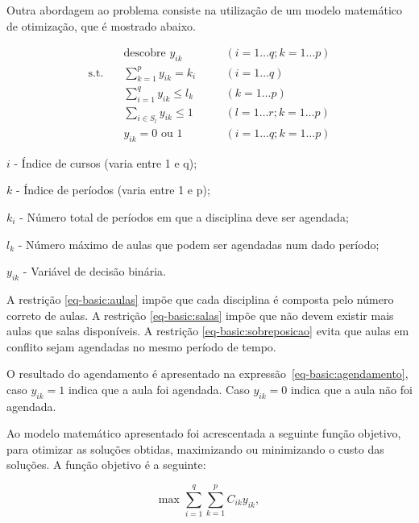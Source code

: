 Outra abordagem ao problema consiste na utilização de um modelo matemático de otimização, que é mostrado abaixo.

\begin{align}
    & \text{descobre } y_{ik} \quad &&(i = 1 \ldots q; k = 1 \ldots p) \nonumber \\
    \text{s.t.} \quad & \displaystyle\sum_{k=1}^{p} y_{ik} = k_i \quad &&(i = 1 \ldots q) \label{eq-basic:aulas}\\
    & \displaystyle\sum_{i=1}^{q} y_{ik} \leq l_k \quad &&(k = 1 \ldots p) \label{eq-basic:salas}\\
    & \displaystyle\sum_{i \in S_l} y_{ik} \leq 1 \quad &&(l = 1 \ldots r; k = 1 \ldots p) \label{eq-basic:sobreposicao}\\
    & y_{ik} = 0 \text{ ou } 1 \quad &&(i = 1 \ldots q; k = 1 \ldots p) \label{eq-basic:agendamento}
\end{align}

\begin{compactitem}
    \item $i$ - Índice de cursos (varia entre 1 e q);
    \item $k$ - Índice de períodos (varia entre 1 e p);
    \item $k_{i}$ - Número total de períodos em que a disciplina deve ser agendada;
    \item $l_{k}$ - Número máximo de aulas que podem ser agendadas num dado período;
    \item $y_{ik}$ - Variável de decisão binária.
\end{compactitem}

A restrição \eqref{eq-basic:aulas} impõe que cada disciplina é composta pelo número correto de aulas. A restrição \eqref{eq-basic:salas} impõe que não devem existir mais aulas que salas disponíveis. A restrição \eqref{eq-basic:sobreposicao} evita que aulas em conflito sejam agendadas no mesmo período de tempo.

O resultado do agendamento é apresentado na expressão~\eqref{eq-basic:agendamento}, caso $y_{ik} = 1$ indica que a aula foi agendada. Caso $y_{ik} = 0$ indica que a aula não foi agendada.

Ao modelo matemático apresentado foi acrescentada a seguinte função objetivo, para otimizar as soluções obtidas, maximizando ou minimizando o custo das soluções. A função objetivo é a seguinte:

\begin{equation}
    \text{max } \displaystyle\sum_{i=1}^{q} \displaystyle\sum_{k=1}^{p} C_{ik}y_{ik},
\end{equation}

